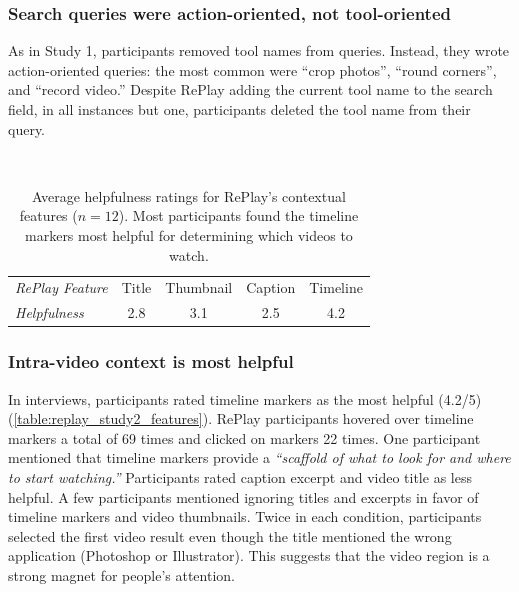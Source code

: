 
\subsubsection{Search queries were action-oriented, not tool-oriented}
As in Study 1, participants removed tool names from queries. Instead, they wrote action-oriented queries: the most common were ``crop photos'', ``round corners'', and ``record video.'' Despite RePlay adding the current tool name to the search field, in all instances but one, participants deleted the tool name from their query.

\begin{table}[t]
\centering
\caption{Average helpfulness ratings for RePlay's contextual features ($n\!=\!12$). Most participants found the timeline markers most helpful for determining which videos to watch.}~\label{table:replay_study2_features}
\begin{tabular}{lllll}
\textit{RePlay Feature} & Title                   & Thumbnail               & Caption                 & Timeline                \\ 
\textit{Helpfulness}    & \multicolumn{1}{c}{2.8} & \multicolumn{1}{c}{3.1} & \multicolumn{1}{c}{2.5} & \multicolumn{1}{c}{4.2}
\end{tabular}
\end{table}

\subsubsection{Intra-video context is most helpful}
In interviews, participants rated timeline markers as the most helpful (4.2/5) (\autoref{table:replay_study2_features}). RePlay participants hovered over timeline markers a total of 69 times and clicked on markers 22 times. One participant mentioned that timeline markers provide a \textit{``scaffold of what to look for and where to start watching.''} Participants rated caption excerpt and video title as less helpful. A few participants mentioned ignoring titles and excerpts in favor of timeline markers and video thumbnails. Twice in each condition, participants selected the first video result even though the title mentioned the wrong application (Photoshop or Illustrator). This suggests that the video region is a strong magnet for people's attention.


